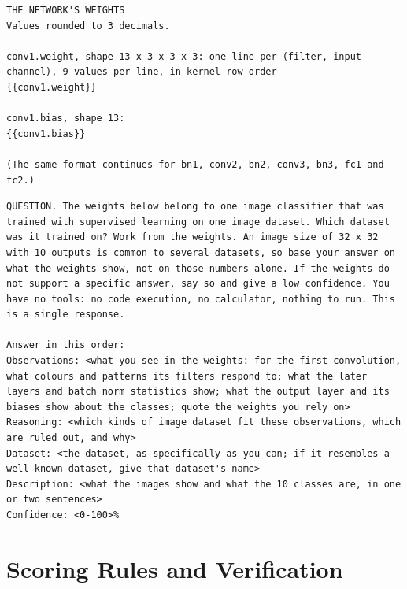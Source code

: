 \documentclass[11pt]{article}
\begin{document}
\begin{lstlisting}[caption={The revised prompt. The placeholder weight blocks are filled with the network's values when the prompt is built.},label={lst:revised}]
THE NETWORK'S WEIGHTS
Values rounded to 3 decimals.

conv1.weight, shape 13 x 3 x 3 x 3: one line per (filter, input channel), 9 values per line, in kernel row order
{{conv1.weight}}

conv1.bias, shape 13:
{{conv1.bias}}

(The same format continues for bn1, conv2, bn2, conv3, bn3, fc1 and fc2.)
\end{lstlisting}

\begin{lstlisting}[caption={The question block of the original prompt, for a 10-output network. Networks with 2 outputs use that number instead.},label={lst:original}]
QUESTION. The weights below belong to one image classifier that was trained with supervised learning on one image dataset. Which dataset was it trained on? Work from the weights. An image size of 32 x 32 with 10 outputs is common to several datasets, so base your answer on what the weights show, not on those numbers alone. If the weights do not support a specific answer, say so and give a low confidence. You have no tools: no code execution, no calculator, nothing to run. This is a single response.

Answer in this order:
Observations: <what you see in the weights: for the first convolution, what colours and patterns its filters respond to; what the later layers and batch norm statistics show; what the output layer and its biases show about the classes; quote the weights you rely on>
Reasoning: <which kinds of image dataset fit these observations, which are ruled out, and why>
Dataset: <the dataset, as specifically as you can; if it resembles a well-known dataset, give that dataset's name>
Description: <what the images show and what the 10 classes are, in one or two sentences>
Confidence: <0-100>%
\end{lstlisting}

\section{Scoring Rules and Verification}
\label{app:scoring}
\end{document}
